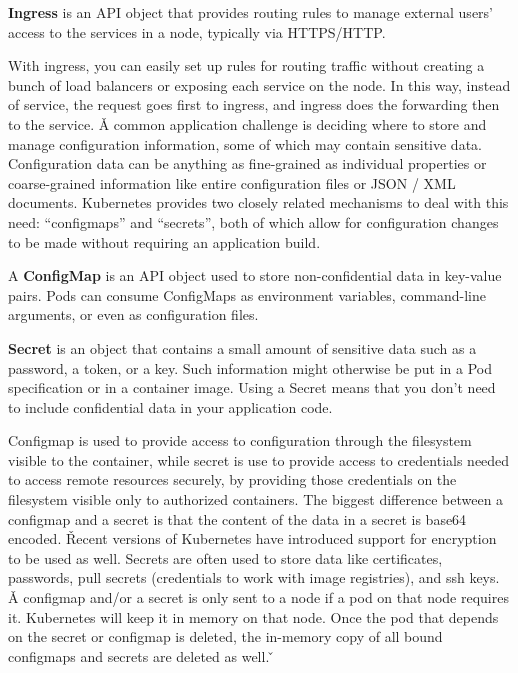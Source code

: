 \bd[Ingress]
\textbf{Ingress} is an API object that provides routing rules to manage external users' access to the services in a
node, typically via HTTPS/HTTP\@.
\ed


With ingress, you can easily set up rules for routing traffic without creating a bunch of load balancers or exposing
each service on the node. In this way, instead of service, the request goes first to ingress, and ingress does the
forwarding then to the service. \v

A common application challenge is deciding where to store and manage configuration information, some of which may
contain sensitive data. Configuration data can be anything as fine-grained as individual properties or
coarse-grained information like entire configuration files or JSON / XML documents. Kubernetes provides two closely
related mechanisms to deal with this need: ``configmaps'' and ``secrets'', both of which allow for configuration
changes to be made without requiring an application build.

\bd[ConfigMap]
A \textbf{ConfigMap} is an API object used to store non-confidential data in key-value pairs. Pods can consume
ConfigMaps as environment variables, command-line arguments, or even as configuration files.
\ed

\bd[Secret]
\textbf{Secret} is an object that contains a small amount of sensitive data such as a password, a token, or a key. Such
information might otherwise be put in a Pod specification or in a container image. Using a Secret means that you don't
need to include confidential data in your application code.
\ed


Configmap is used to provide access to configuration through the filesystem visible to the container, while secret is
use to provide access to credentials needed to access remote resources securely, by providing those credentials on
the filesystem visible only to authorized containers. The biggest difference between a configmap and a secret is that
the content of the data in a secret is base64 encoded. \v

Recent versions of Kubernetes have introduced support for encryption
to be used as well. Secrets are often used to store data like certificates, passwords, pull secrets (credentials to work
with image registries), and ssh keys. \v

A configmap and/or a secret is only sent to a node if a pod on that node requires it. Kubernetes will keep it in
memory on that node. Once the pod that depends on the secret or configmap is deleted, the in-memory copy of all
bound configmaps and secrets are deleted as well. \v

